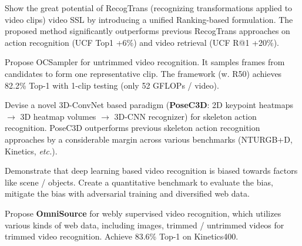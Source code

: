 \documentclass{resume}
\begin{document}
\vspace{-2mm}

Show the great potential of RecogTrans (recognizing transformations applied to video clips) video SSL by introducing a unified Ranking-based formulation.
The proposed method significantly outperforms previous RecogTrans approaches on action recognition (UCF Top1 +6\%) and video retrieval (UCF R@1 +20\%).

\vspace{-2mm}

Propose OCSampler for untrimmed video recognition.
It samples frames from candidates to form one representative clip.
The framework (w. R50) achieves 82.2\% Top-1 with 1-clip testing (only 52 GFLOPs / video).

\vspace{-2mm}

Devise a novel 3D-ConvNet based paradigm (\textbf{PoseC3D}: 2D keypoint heatmaps $\rightarrow$ 3D heatmap volumes $\rightarrow$ 3D-CNN recognizer) for skeleton action recognition. PoseC3D outperforms previous skeleton action recognition approaches by a considerable margin across various benchmarks (NTURGB+D, Kinetics, \emph{etc.}).

\vspace{-2mm}

Demonstrate that deep learning based video recognition is biased towards factors like scene / objects.
Create a quantitative benchmark to evaluate the bias, mitigate the bias with adversarial training and diversified web data.

\vspace{-2mm}

Propose \textbf{OmniSource} for webly supervised video recognition, which utilizes various kinds of web data, including images, trimmed / untrimmed videos for trimmed video recognition. Achieve 83.6\% Top-1 on Kinetics400.
\end{document}
